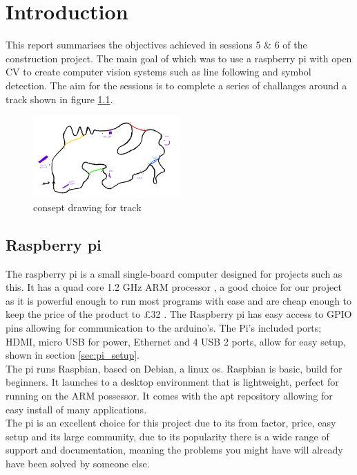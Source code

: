  	






\setcounter{page}{0}

\tableofcontents

		\chapter{Introduction}
		
This report summarises the objectives achieved in sessions 5 \& 6 of the construction project. The main goal of which was to use a raspberry pi with open CV to create computer vision systems such as line following and symbol detection. The aim for the sessions is to complete a series of challanges around a track shown in figure \ref{fig:track}. 

\begin{figure}[h]%
	\centering
	\includegraphics[width = 0.5\textwidth]{"assets/track"}
	\caption{consept drawing for track}
	\label{fig:track}
\end{figure}

		
	\section{Raspberry pi}
The raspberry pi is a small single-board computer designed for projects such as this. It has a quad core 1.2 GHz ARM processor \cite{pi_product_page}, a good choice for our project as it is powerful enough to run most programs with ease and are cheap enough to keep the price of the product to £32 \cite{pi_product_price}. The Raspberry pi has easy access to GPIO pins allowing for communication to the arduino's. The Pi's included ports; HDMI, micro USB for power, Ethernet and 4 USB 2 ports, allow for easy setup, shown in section \ref{sec:pi_setup}.\\ The pi runs Raspbian, based on Debian, a linux os. Raspbian is basic, build for beginners. It launches to a desktop environment that is lightweight, perfect for running on the ARM possessor. It comes with the apt repository allowing for easy install of many applications. \\
The pi is an excellent choice for this project due to its from factor, price, easy setup and its large community, due to its popularity there is a wide range of support and documentation, meaning the problems you might have will already have been solved by someone else.    
